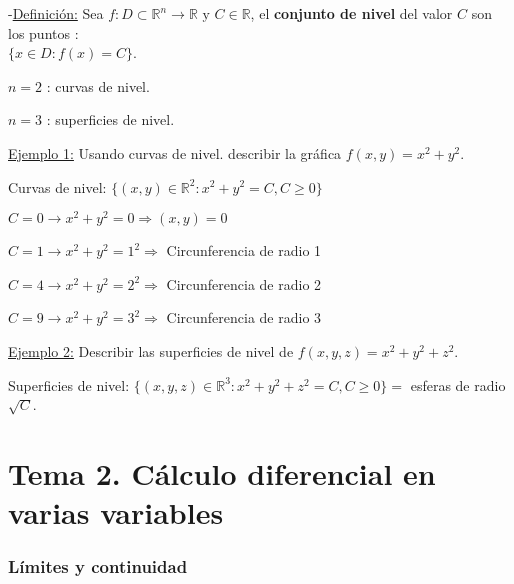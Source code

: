 \documentclass[10pt, titlepage]{article}
\newcommand{\R}{\mathbb{R}}
\newcommand{\definicion}{\noindent-\underline{Definición:} }
\newcommand{\dindent}{\indent\indent}
\begin{document}
\definicion Sea $f : D \subset \R^n \to \R \text{ y  } C \in \R$, el \textbf{conjunto de nivel} del valor $C$ son 
los puntos : \\ $\{x \in D : f (x) = C\}$.
\vspace{3mm}

$n = 2$ : curvas de nivel.
\vspace{3mm}

$n = 3$ : superficies de nivel.
\vspace{5mm}

\underline{Ejemplo 1:} Usando curvas de nivel. describir la gráfica $f (x, y) = x^2 + y^2$.
\vspace{3mm}

\dindent Curvas de nivel: $\{ (x, y) \in \R^2 : x^2 + y^2 = C, C \geq 0\}$
\vspace{3mm}

\dindent$C = 0 \to x^2 + y^2 = 0 \Rightarrow (x, y) = 0$
\vspace{3mm}

\dindent$C = 1 \to x^2 + y^2 = 1^2 \Rightarrow$ Circunferencia de radio 1
\vspace{3mm}

\dindent$C = 4 \to x^2 + y^2 = 2^2 \Rightarrow$ Circunferencia de radio 2
\vspace{3mm}

\dindent$C = 9 \to x^2 + y^2 = 3^2 \Rightarrow$ Circunferencia de radio 3
\vspace{5mm}

\underline{Ejemplo 2:} Describir las superficies de nivel de $f (x, y, z) = x^2 + y^2 + z^2$.
\vspace{3mm}

\dindent Superficies de nivel: $\{ (x, y, z) \in \R^3 : x^2 + y^2 + z^2 = C, C \geq 0\} =$ esferas de radio $ 
\sqrt{C}$.
\vspace{7mm}


\part*{Tema 2. Cálculo diferencial en varias variables}
\vspace{5mm}

\setcounter{section}{0}


\section{Límites y continuidad}
\vspace{5mm}
\end{document}
